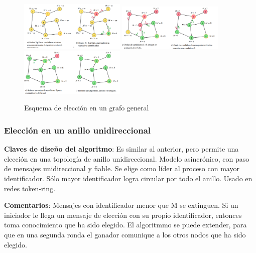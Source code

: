 \begin{figure}[H]
    \centering
    \includegraphics[width=0.45\textwidth]{img/GG_1.png}
    \includegraphics[width=0.45\textwidth]{img/GG_2.png}
    \includegraphics[width=0.45\textwidth]{img/GG_3.png}
    \caption{Esquema de elección en un grafo general}
\end{figure}

\subsubsection{Elección en un anillo unidireccional} 

\textbf{Claves de diseño del algoritmo}: Es similar al anterior, pero permite una elección en una topología de anillo unidireccional. Modelo asincrónico, con paso de mensajes unidireccional y fiable. Se elige como líder al proceso con mayor identificador. Sólo mayor identificador logra circular por todo el anillo. Usado en redes token-ring.

\textbf{Comentarios}: Mensajes con identificador menor que M se extinguen. Si un iniciador le llega un mensaje de elección con su propio identificador, entonces toma conocimiento que ha sido elegido. El algoritmmo se puede extender, para que en una segunda ronda el ganador comunique a los otros nodos que ha sido elegido.

